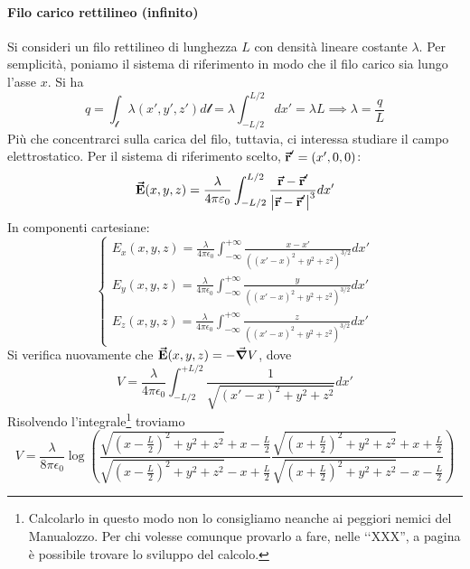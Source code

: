 \paragraph{Filo carico rettilineo (infinito)}
	Si consideri un filo rettilineo di lunghezza $L$ con densità lineare costante $\lambda$. Per semplicità, poniamo il sistema di riferimento in modo che il filo carico sia lungo l'asse $x$. Si ha
	\begin{equation*}
		q=\int_{\mathcal{l}}\lambda(x',y',z')d\mathcal{l}=\lambda\int_{-L/2}^{L/2}dx'=\lambda L\implies \lambda=\frac{q}{L}
	\end{equation*}
	 Più che concentrarci sulla carica del filo, tuttavia, ci interessa studiare il campo elettrostatico. Per il sistema di riferimento scelto, $\vb*{\va{r}}'=\left(x',0,0\right)$:
	\begin{equation}
		\vb*{\va{E}}(x,y,z)=\frac{\lambda}{4\pi\varepsilon_0}\int_{-L/2}^{L/2}\frac{\vb*{\va{r}}-\vb*{\va{r}}'}{\abs{\vb*{\va{r}}-\vb*{\va{r}}'}^3}dx'
	\end{equation}
	In componenti cartesiane:
	\begin{equation*}
		\begin{cases}
			E_x(x,y,z)=\frac{\lambda}{4\pi\epsilon_0}\int_{-\infty}^{+\infty}\frac{x-x'}{\left((x'-x)^2+y^2+z^2\right)^{3/2}}dx'\\
			E_y(x,y,z)=\frac{\lambda}{4\pi\epsilon_0}\int_{-\infty}^{+\infty}\frac{y}{\left((x'-x)^2+y^2+z^2\right)^{3/2}}dx'\\
			E_z(x,y,z)=\frac{\lambda}{4\pi\epsilon_0}\int_{-\infty}^{+\infty}\frac{z}{\left((x'-x)^2+y^2+z^2\right)^{3/2}}dx'
		\end{cases}
	\end{equation*}
	Si verifica nuovamente che $\vb*{\va{E}}(x,y,z)=-\grad{V}$, dove
	\begin{equation}
		V=\frac{\lambda}{4\pi\epsilon_0}\int_{-L/2}^{+L/2}\frac{1}{\sqrt{(x'-x)^2+y^2+z^2}}dx'
	\end{equation}
	Risolvendo l'integrale\footnote{Calcolarlo in questo modo non lo consigliamo neanche ai peggiori nemici del Manualozzo\texttrademark. Per chi volesse comunque provarlo a fare, nelle ‘‘XXX'', a pagina \pageref{XXX} è possibile trovare lo sviluppo del calcolo.} troviamo
	\begin{equation}
		V=\frac{\lambda}{8\pi\epsilon_0}\log\left(\frac{\sqrt{\left(x-\frac{L}{2}\right)^2+y^2+z^2}+x-\frac{L}{2}}{\sqrt{\left(x-\frac{L}{2}\right)^2+y^2+z^2}-x+\frac{L}{2}}\frac{\sqrt{\left(x+\frac{L}{2}\right)^2+y^2+z^2}+x+\frac{L}{2}}{\sqrt{\left(x+\frac{L}{2}\right)^2+y^2+z^2}-x-\frac{L}{2}}\right)
	\end{equation}
